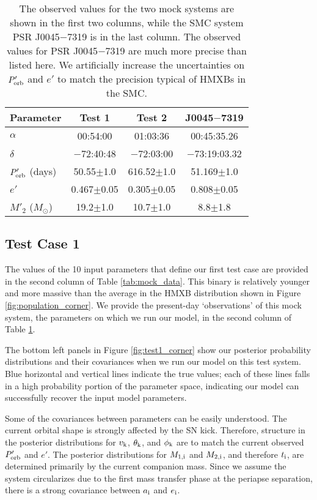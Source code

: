 \documentclass[usenatbib]{mnras}
\newcommand{\Msun}{\ifmmode {M_{\odot}}\else${M_{\odot}}$\fi}
\begin{document}
\begin{table}
\begin{center}
\caption{The observed values for the two mock systems are shown in the first two columns, while the SMC system PSR J0045$-$7319 is in the last column. The observed values for PSR J0045$-$7319 are much more precise than listed here. We artificially increase the uncertainties on $P'_{\rm orb}$ and $e'$ to match the precision typical of HMXBs in the SMC.}
\label{tab:observations}
\begin{tabular}{lccc} 
\toprule
Parameter & Test 1 & Test 2 & J0045$-$7319 \\
\midrule
$\alpha$ & 00:54:00 & 01:03:36 & 00:45:35.26 \\
$\delta$ & $-$72:40:48 & $-$72:03:00 & $-$73:19:03.32 \\
$P'_{\rm orb}$ (days) & 50.55$\pm$1.0 & 616.52$\pm$1.0 & 51.169$\pm$1.0 \\
$e'$ & 0.467$\pm$0.05 & 0.305$\pm$0.05 & 0.808$\pm$0.05 \\
$M'_2$ (\Msun) & 19.2$\pm$1.0 & 10.7$\pm$1.0 & 8.8$\pm$1.8 \\
\bottomrule
\end{tabular}
\end{center}
\end{table}




\subsection{Test Case 1} \label{sec:test1}


The values of the 10 input parameters that define our first test case are provided in the second column of Table \ref{tab:mock_data}. This binary is relatively younger and more massive than the average in the HMXB distribution shown in Figure \ref{fig:population_corner}. We provide the present-day `observations' of this mock system, the parameters on which we run our model, in the second column of Table \ref{tab:observations}.

The bottom left panels in Figure \ref{fig:test1_corner} show our posterior probability distributions and their covariances when we run our model on this test system. Blue horizontal and vertical lines indicate the true values; each of these lines falls in a high probability portion of the parameter space, indicating our model can successfully recover the input model parameters. 

Some of the covariances between parameters can be easily understood. The current orbital shape is strongly affected by the SN kick. Therefore, structure in the posterior distributions for $v_{\rm k}$, $\theta_{\rm k}$, and $\phi_{\rm k}$ are to match the current observed $P'_{\rm orb}$ and $e'$. The posterior distributions for $M_{\rm 1,i}$ and $M_{\rm 2,i}$, and therefore $t_{\rm i}$, are determined primarily by the current companion mass. Since we assume the system circularizes due to the first mass transfer phase at the periapse separation, there is a strong covariance between $a_{\rm i}$ and $e_{\rm i}$.
\end{document}
